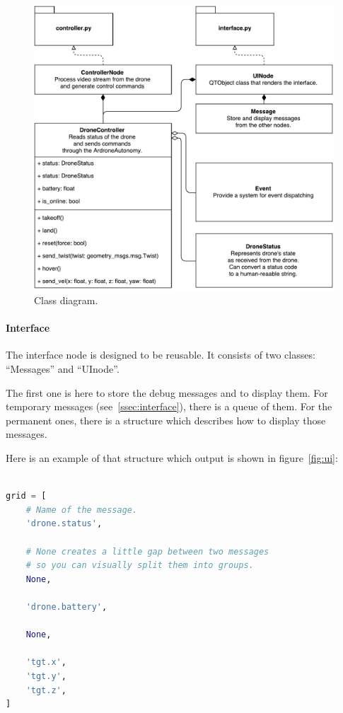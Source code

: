 \documentclass[12pt]{article}
\begin{document}
    \begin{figure}[htbp]
        \noindent\centering
            \includegraphics[width=\textwidth]{uml.pdf}
        \caption{Class diagram.}
        \label{fig:uml}
    \end{figure}

    \paragraph{Interface} The interface node is designed to be reusable.
    It consists of two classes: ``Messages'' and ``UInode''.

    The first one is here to store the debug messages and to display them.
    For temporary messages (see~\ref{ssec:interface}), there is a queue
    of them. For the permanent ones, there is a structure which describes
    how to display those messages.

    Here is an example of that structure which output is shown in figure~\ref{fig:ui}:

    \begin{lstlisting}[frame=single,language=Python]

grid = [
    # Name of the message.
    'drone.status',

    # None creates a little gap between two messages
    # so you can visually split them into groups.
    None,

    'drone.battery',
    
    None,
    
    'tgt.x',
    'tgt.y',
    'tgt.z',
]

    \end{lstlisting}
\end{document}
